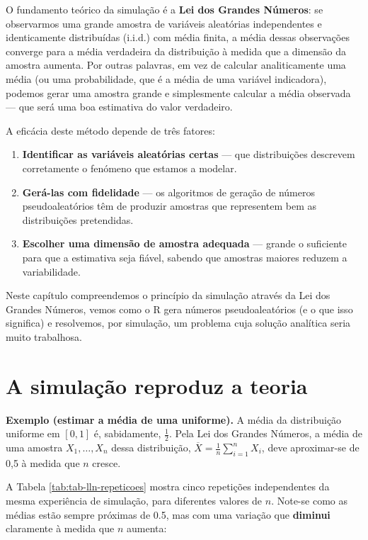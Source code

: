 \documentclass[
  portuguese,
  11pt,
  openany]{book}
\providecommand{\tightlist}{%
  \setlength{\itemsep}{0pt}\setlength{\parskip}{0pt}}
\begin{document}
O fundamento teórico da simulação é a \textbf{Lei dos Grandes Números}: se observarmos uma
grande amostra de variáveis aleatórias independentes e identicamente distribuídas
(i.i.d.) com média finita, a média dessas observações converge para a média verdadeira
da distribuição à medida que a dimensão da amostra aumenta. Por outras palavras, em vez
de calcular analiticamente uma média (ou uma probabilidade, que é a média de uma
variável indicadora), podemos gerar uma amostra grande e simplesmente calcular a média
observada --- que será uma boa estimativa do valor verdadeiro.

A eficácia deste método depende de três fatores:

\begin{enumerate}
\def\labelenumi{\arabic{enumi}.}
\tightlist
\item
  \textbf{Identificar as variáveis aleatórias certas} --- que distribuições descrevem
  corretamente o fenómeno que estamos a modelar.
\item
  \textbf{Gerá-las com fidelidade} --- os algoritmos de geração de números pseudoaleatórios
  têm de produzir amostras que representem bem as distribuições pretendidas.
\item
  \textbf{Escolher uma dimensão de amostra adequada} --- grande o suficiente para que a
  estimativa seja fiável, sabendo que amostras maiores reduzem a variabilidade.
\end{enumerate}

Neste capítulo compreendemos o princípio da simulação através da Lei dos Grandes
Números, vemos como o R gera números pseudoaleatórios (e o que isso significa) e
resolvemos, por simulação, um problema cuja solução analítica seria muito trabalhosa.

\section{A simulação reproduz a teoria}\label{a-simulauxe7uxe3o-reproduz-a-teoria}

\textbf{Exemplo (estimar a média de uma uniforme).} A média da distribuição uniforme em
\([0, 1]\) é, sabidamente, \(\frac{1}{2}\). Pela Lei dos Grandes Números, a média de uma
amostra \(X_1, \ldots, X_n\) dessa distribuição, \(\overline{X} = \frac{1}{n}\sum_{i=1}^n X_i\),
deve aproximar-se de 0,5 à medida que \(n\) cresce.

A Tabela \ref{tab:tab-lln-repeticoes} mostra cinco repetições independentes da mesma experiência de simulação, para diferentes valores de \(n\). Note-se como as médias estão sempre próximas de 0.5, mas com uma variação
que \textbf{diminui} claramente à medida que \(n\) aumenta:
\end{document}
